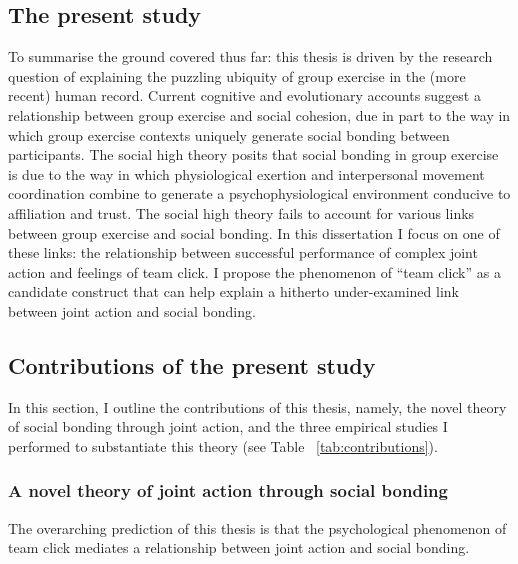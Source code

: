 \begin{CJK}{UTF8}{gbsn}
\section{The present study\label{sect:presentStudy}}

To summarise the ground covered thus far: this thesis is driven by the research question of explaining the puzzling ubiquity of group exercise in the (more recent) human record. Current cognitive and evolutionary accounts suggest a relationship between group exercise and social cohesion, due in part to the way in which group exercise contexts uniquely generate social bonding between participants.  The social high theory posits that social bonding in group exercise is due to the way in which physiological exertion and interpersonal movement coordination combine to generate a psychophysiological environment conducive to affiliation and trust.  The social high theory fails to account for various links between group exercise and social bonding.  In this dissertation I focus on one of these links: the relationship between successful performance of complex joint action and feelings of team click.   I propose the phenomenon of ``team click'' as a candidate construct that can help explain a hitherto under-examined link between joint action and social bonding.


\subsection{Contributions of the present study\label{sect:contributions}}



In this section, I outline the contributions of this thesis, namely, the novel theory of social bonding through joint action, and the three empirical studies I performed to substantiate this theory (see Table ~\ref{tab:contributions}).


\subsubsection{A novel theory of joint action through social bonding}




    The overarching prediction of this thesis is that the psychological phenomenon of team click mediates a relationship between joint action and social bonding.


\end{CJK}
